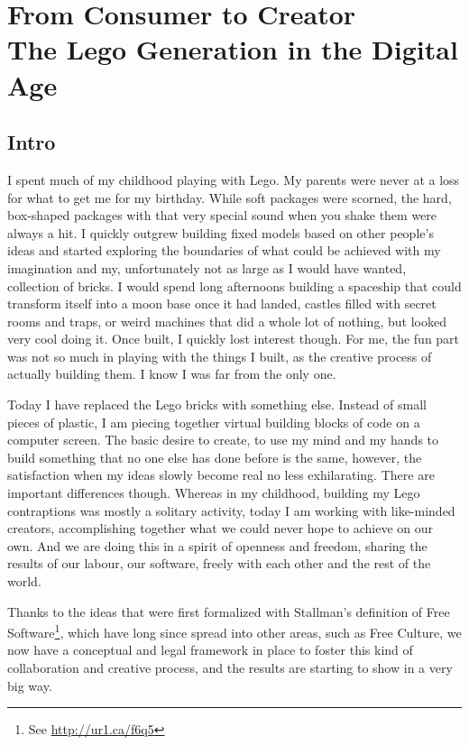 \begin{savequote}
\end{savequote}
\chapter[From Consumer to Creator]{From Consumer to Creator\\ \Large{The Lego Generation in the Digital Age}}
\label{c:consumer_to_creator}

\section{Intro}
\label{s:consumer_to_creator:intro}

I spent much of my childhood playing with Lego. My parents were never at a loss
for what to get me for my birthday. While soft packages were scorned, the hard,
box-shaped packages with that very special sound when you shake them were always
a hit. I quickly outgrew building f\hbox{}ixed models based on other people's
ideas and started exploring the boundaries of what could be achieved with my
imagination and my, unfortunately not as large as I would have wanted,
collection of bricks. I would spend long afternoons building a spaceship that
could transform itself into a moon base once it had landed, castles
f\hbox{}illed with secret rooms and traps, or weird machines that did a whole
lot of nothing, but looked very cool doing it. Once built, I quickly lost
interest though. For me, the fun part was not so much in playing with the things
I built, as the creative process of actually building them. I know I was far
from the only one.

Today I have replaced the Lego bricks with something else. Instead of small
pieces of plastic, I am piecing together virtual building blocks of code on a
computer screen. The basic desire to create, to use my mind and my hands to
build something that no one else has done before is the same, however, the
satisfaction when my ideas slowly become real no less exhilarating. There are
important dif\hbox{}ferences though. Whereas in my childhood, building my Lego
contraptions was mostly a solitary activity, today I am working with like-minded
creators, accomplishing together what we could never hope to achieve on our own.
And we are doing this in a spirit of openness and freedom, sharing the results
of our labour, our software, freely with each other and the rest of the world. 

Thanks to the ideas that were f\hbox{}irst formalized with Stallman's definition
of Free Software\footnote{See \url{http://ur1.ca/f6q5}},
which have long since spread into other areas, such as Free Culture, we now have
a conceptual and legal framework in place to foster this kind of collaboration
and creative process, and the results are starting to show in a very big way. 

